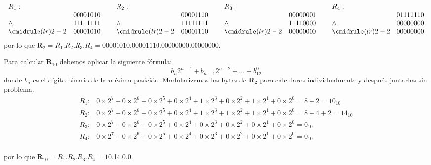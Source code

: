\documentclass[stu, 12pt, letterpaper, donotrepeattitle, floatsintext, natbib]{apa7}
\begin{document}
\[
    \begin{matrix}
        \begin{array}{lr}
           R_1:   & \\
               & 00001010  \\ %
            \land  & 11111111 \\ %
            \cmidrule(lr){2-2}
              & 00001010  \\ %
            \end{array}\,\,
        & 
        \begin{array}{lr}
            R_2:   & \\
               & 00001110  \\
            \land  & 11111111 \\
            \cmidrule(lr){2-2}
              & 00001110  \\
            \end{array}\,\,
        & 
        \begin{array}{lr}
            R_3:   & \\
               & 00000001  \\
            \land  & 11110000 \\
            \cmidrule(lr){2-2}
              & 00000000  \\
            \end{array}\,\,
        & 
        \begin{array}{lr}
            R_4:   & \\
               & 01111110  \\
            \land  & 00000000 \\
            \cmidrule(lr){2-2}
              & 00000000  \\
            \end{array}
        \end{matrix}
\]
por lo que $\textbf{R}_2=R_1$.$R_2$.$R_3$.$R_4=00001010$.$00001110$.$00000000$.$00000000$.\par
\vspace{\baselineskip}
Para calcular $\textbf{R}_{10}$ debemos aplicar la siguiente fórmula:
\[b_n2^{n-1}+b_{n-1}2^{n-2}+\dots+b_12^0\]
donde $b_n$ es el dígito binario de la $n$-ésima posición. Modularizamos los bytes de $\textbf{R}_2$ para
calcularos individualmente y después juntarlos sin problema.
\[\begin{matrix}
    R_1: & 0\times2^7+0\times2^6+0\times2^5+0\times2^4+1\times2^3+0\times2^2+1\times2^1+0\times2^0=8+2=10_{10} \\
    R_2: & 0\times2^7+0\times2^6+0\times2^5+0\times2^4+1\times2^3+1\times2^2+1\times2^1+0\times2^0=8+4+2=14_{10} \\
    R_3: & 0\times2^7+0\times2^6+0\times2^5+0\times2^4+0\times2^3+0\times2^2+0\times2^1+0\times2^0=0_{10}\\
    R_4: & 0\times2^7+0\times2^6+0\times2^5+0\times2^4+0\times2^3+0\times2^2+0\times2^1+0\times2^0=0_{10}\\     
\end{matrix}\]\par
por lo que $\textbf{R}_{10}=R_1$.$R_2$.$R_3$.$R_4=10$.14.0.0.
\vspace{\baselineskip}
\end{document}
